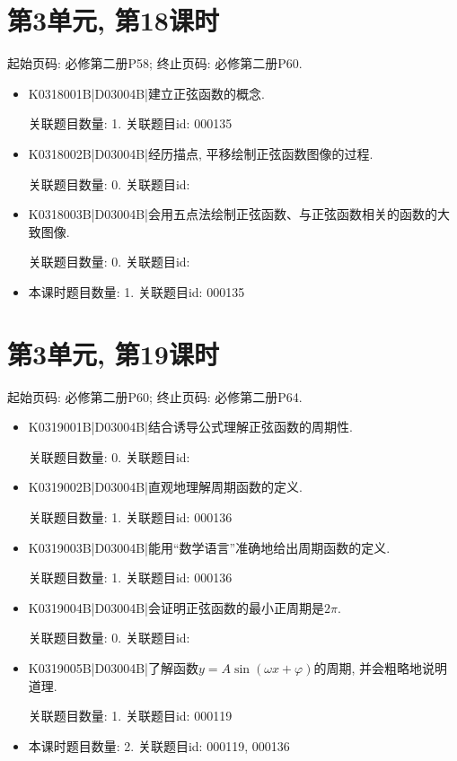 \section*{第3单元, 第18课时}
起始页码: 必修第二册P58; 终止页码: 必修第二册P60.
\begin{itemize}
\item K0318001B|D03004B|建立正弦函数的概念.

关联题目数量: 1. 关联题目id: 000135

\item K0318002B|D03004B|经历描点, 平移绘制正弦函数图像的过程.

关联题目数量: 0. 关联题目id: 

\item K0318003B|D03004B|会用五点法绘制正弦函数、与正弦函数相关的函数的大致图像.

关联题目数量: 0. 关联题目id: 

\item 本课时题目数量: 1. 关联题目id: 000135

\end{itemize}

\section*{第3单元, 第19课时}
起始页码: 必修第二册P60; 终止页码: 必修第二册P64.
\begin{itemize}
\item K0319001B|D03004B|结合诱导公式理解正弦函数的周期性.

关联题目数量: 0. 关联题目id: 

\item K0319002B|D03004B|直观地理解周期函数的定义.

关联题目数量: 1. 关联题目id: 000136

\item K0319003B|D03004B|能用``数学语言''准确地给出周期函数的定义.

关联题目数量: 1. 关联题目id: 000136

\item K0319004B|D03004B|会证明正弦函数的最小正周期是$2\pi$.

关联题目数量: 0. 关联题目id: 

\item K0319005B|D03004B|了解函数$y=A\sin(\omega x+\varphi)$的周期, 并会粗略地说明道理.

关联题目数量: 1. 关联题目id: 000119

\item 本课时题目数量: 2. 关联题目id: 000119, 000136

\end{itemize}

